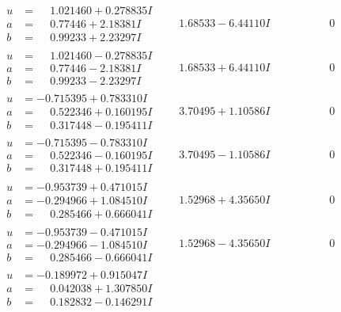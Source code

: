 \documentclass[1p]{elsarticle_modified}
\theoremstyle{definition}
\begin{document}
$$\begin{array}{c|c|c}
\begin{aligned}
u &= \phantom{-}1.021460 + 0.278835 I \\
a &= \phantom{-}0.77446 + 2.18381 I \\
b &= \phantom{-}0.99233 + 2.23297 I\end{aligned}
 & \phantom{-}1.68533 - 6.44110 I & \phantom{-0.000000 } 0 \\ \hline\begin{aligned}
u &= \phantom{-}1.021460 - 0.278835 I \\
a &= \phantom{-}0.77446 - 2.18381 I \\
b &= \phantom{-}0.99233 - 2.23297 I\end{aligned}
 & \phantom{-}1.68533 + 6.44110 I & \phantom{-0.000000 } 0 \\ \hline\begin{aligned}
u &= -0.715395 + 0.783310 I \\
a &= \phantom{-}0.522346 + 0.160195 I \\
b &= \phantom{-}0.317448 - 0.195411 I\end{aligned}
 & \phantom{-}3.70495 + 1.10586 I & \phantom{-0.000000 } 0 \\ \hline\begin{aligned}
u &= -0.715395 - 0.783310 I \\
a &= \phantom{-}0.522346 - 0.160195 I \\
b &= \phantom{-}0.317448 + 0.195411 I\end{aligned}
 & \phantom{-}3.70495 - 1.10586 I & \phantom{-0.000000 } 0 \\ \hline\begin{aligned}
u &= -0.953739 + 0.471015 I \\
a &= -0.294966 + 1.084510 I \\
b &= \phantom{-}0.285466 + 0.666041 I\end{aligned}
 & \phantom{-}1.52968 + 4.35650 I & \phantom{-0.000000 } 0 \\ \hline\begin{aligned}
u &= -0.953739 - 0.471015 I \\
a &= -0.294966 - 1.084510 I \\
b &= \phantom{-}0.285466 - 0.666041 I\end{aligned}
 & \phantom{-}1.52968 - 4.35650 I & \phantom{-0.000000 } 0 \\ \hline\begin{aligned}
u &= -0.189972 + 0.915047 I \\
a &= \phantom{-}0.042038 + 1.307850 I \\
b &= \phantom{-}0.182832 - 0.146291 I\end{aligned}

\end{array}$$
\end{document}
